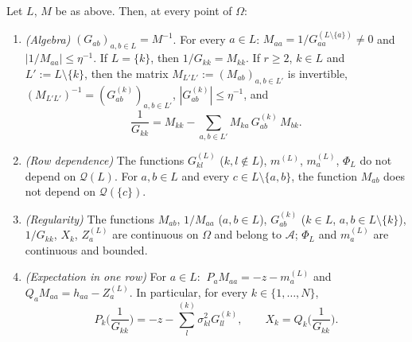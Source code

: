 \begin{lemma}\label{lem:FAstruct}
Let $L$, $M$ be as above. Then, at every point of $\Omega$:
\begin{enumerate}[label=\textup{(\alph*)},leftmargin=2.2em,itemsep=1pt]
\item \emph{(Algebra)} $(G_{ab})_{a,b\in L}=M^{-1}$. For every $a\in L$: $M_{aa}=1/G^{(L\setminus\{a\})}_{aa}\ne0$ and $|1/M_{aa}|\le\eta^{-1}$. If $L=\{k\}$, then $1/G_{kk}=M_{kk}$. If $r\ge2$, $k\in L$ and $L':=L\setminus\{k\}$, then
the matrix $M_{L'L'}:=(M_{ab})_{a,b\in L'}$ is invertible, $(M_{L'L'})^{-1}=(G^{(k)}_{ab})_{a,b\in L'}$, $|G^{(k)}_{ab}|\le\eta^{-1}$, and
\begin{equation}\label{eq:1overGL}
 \frac1{G_{kk}}=M_{kk}-\sum_{a,b\in L'}M_{ka}\,G^{(k)}_{ab}\,M_{bk}.
\end{equation}
\item \emph{(Row dependence)} The functions $G^{(L)}_{kl}$ ($k,l\notin L$), $m^{(L)}$, $m^{(L)}_a$, $\Phi_L$ do not depend on $\mathcal Q(L)$. For $a,b\in L$ and every $c\in L\setminus\{a,b\}$, the function $M_{ab}$ does not depend on $\mathcal Q(\{c\})$.
\item \emph{(Regularity)} The functions $M_{ab}$, $1/M_{aa}$ ($a,b\in L$), $G^{(k)}_{ab}$ ($k\in L$, $a,b\in L\setminus\{k\}$), $1/G_{kk}$, $X_k$, $Z_a^{(L)}$ are continuous on $\Omega$ and belong to $\mathcal A$; $\Phi_L$ and $m_a^{(L)}$ are continuous and bounded.
\item \emph{(Expectation in one row)} For $a\in L$: $\ P_aM_{aa}=-z-m^{(L)}_a$ and $Q_aM_{aa}=h_{aa}-Z^{(L)}_a$. In particular, for every $k\in\{1,\dots,N\}$,
\[
 P_k\Big(\frac1{G_{kk}}\Big)=-z-\sum^{(k)}_l\sigma_{kl}^2G^{(k)}_{ll},\qquad X_k=Q_k\Big(\frac1{G_{kk}}\Big).
\]
\end{enumerate}
\end{lemma}
